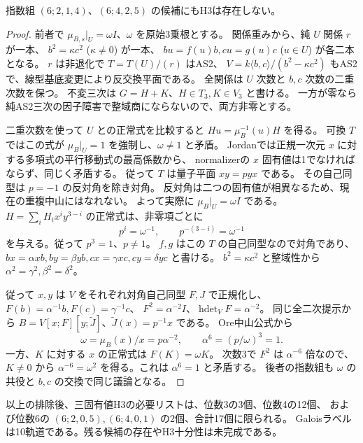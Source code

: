 \begin{theorem}
\label{thm:cubic-sixth-root-two-AS2-empty}
指数組 $(6;2,1,4)$、$(6;4,2,5)$ の候補にもH3は存在しない。
\end{theorem}
\begin{proof}
前者で $\mu_{B,s}|_U=\omega I$、$\omega$ を原始3乗根とする。
関係重みから、純 $U$ 関係 $r$ が一本、
$b^2=\kappa c^2$ ($\kappa\ne0$) が一本、
$bu=f(u)b,cu=g(u)c$ ($u\in U$) が各二本となる。
$r$ は非退化で $T=T(U)/(r)$ はAS2、
$V=k\langle b,c\rangle/(b^2-\kappa c^2)$ もAS2で、線型基底変更により反交換平面である。
全関係は $U$ 次数と $b,c$ 次数の二重次数を保つ。
不変三次は $G=H+K$、$H\in T_3,K\in V_3$ と書ける。
一方が零なら純AS2三次の因子障害で整域商にならないので、両方非零とする。

二重次数を使って $U$ との正常式を比較すると
$Hu=\mu_B^{-1}(u)H$ を得る。
可換 $T$ ではこの式が $\mu_B|_U=1$ を強制し、$\omega\ne1$ と矛盾。
Jordanでは正規一次元 $x$ に対する多項式の平行移動式の最高係数から、
normalizerの $x$ 固有値は1でなければならず、同じく矛盾する。
従って $T$ は量子平面 $xy=p yx$ である。
その自己同型は $p=-1$ の反対角を除き対角。
反対角は二つの固有値が相異なるため、現在の重複中山にはなれない。
よって実際に $\mu_B|_U=\omega I$ である。
$H=\sum_i H_i x^iy^{3-i}$ の正常式は、非零項ごとに
\[
 p^i=\omega^{-1},\qquad p^{-(3-i)}=\omega^{-1}
\]
を与える。従って $p^3=1$、$p\ne1$。
$f,g$ はこの $T$ の自己同型なので対角であり、
$bx=\alpha xb,by=\beta yb,cx=\gamma xc,cy=\delta yc$ と書ける。
$b^2=\kappa c^2$ と整域性から $\alpha^2=\gamma^2,\beta^2=\delta^2$。

従って $x,y$ は $V$ をそれぞれ対角自己同型 $F,J$ で正規化し、
$F(b)=\alpha^{-1}b,F(c)=\gamma^{-1}c$、
$F^2=\alpha^{-2}I$、$\operatorname{hdet}_V F=\alpha^{-2}$。
同じ全二次提示から
$B=V[x;F][y;\widetilde J]$、$\widetilde J(x)=p^{-1}x$ である。
Ore中山公式から
\[
 \omega=\mu_B(x)/x=p\alpha^{-2},\qquad
 \alpha^6=(p/\omega)^3=1.
\]
一方、$K$ に対する $x$ の正常式は $F(K)=\omega K$。
次数3で $F^2$ は $\alpha^{-6}$ 倍なので、$K\ne0$ から
$\alpha^{-6}=\omega^2$ を得る。これは $\alpha^6=1$ と矛盾する。
後者の指数組も $\omega$ の共役と $b,c$ の交換で同じ議論となる。
\end{proof}

\begin{corollary}
\label{cor:cubic-three-eigenvalue-17-list}
以上の排除後、三固有値H3の必要リストは、位数3の3個、位数4の12個、
および位数6の $(6;2,0,5),(6;4,0,1)$ の2個、合計17個に限られる。
Galoisラベルは10軌道である。残る候補の存在やH3十分性は未完成である。
\end{corollary}
